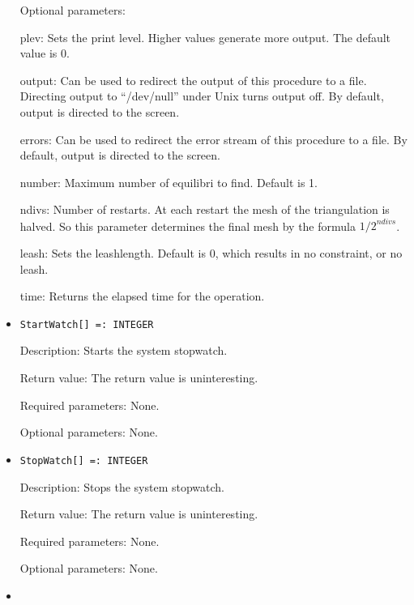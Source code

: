 \begin{itemize}
\item
[Optional parameters:]\hfil\null
	
\bd
\item
[plev:] Sets the print level.  Higher values generate more output.
The default value is 0.
\item
[output:] Can be used to redirect the output of this procedure to a
file.  Directing output to ``/dev/null'' under Unix turns output off.
By default, output is directed to the screen.
\item
[errors:] Can be used to redirect the error stream of this procedure
to a file.  By default, output is directed to the screen.
\item
[number:] Maximum number of equilibri to find. Default is 1.  
\item 
[ndivs:] Number of restarts.  At each restart the mesh of the
triangulation is halved.  So this parameter determines the final mesh
by the formula ${1/2}^{ndivs}$.
\item
[leash:] Sets the leashlength. Default is 0, which results in no
constraint, or no leash.  
\item
[time:] Returns the elapsed time for the operation.
\ed
\ed

\item

\protect \large \begin{verbatim}
StartWatch[] =: INTEGER
\end{verbatim}\normalsize

\bd
\item
[Description:] Starts the system stopwatch.
\item
[Return value:] The return value is uninteresting.
\item
[Required parameters:] None.
\item
[Optional parameters:] None.
\ed

\item
\protect \large \begin{verbatim}
StopWatch[] =: INTEGER
\end{verbatim}\normalsize

\bd
\item
[Description:] Stops the system stopwatch.
\item
[Return value:] The return value is uninteresting.
\item
[Required parameters:] None.
\item
[Optional parameters:] None.
\ed

\item


\end{itemize}
